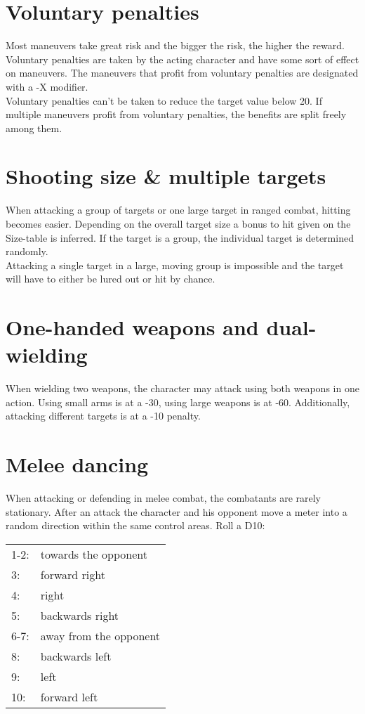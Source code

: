 \documentclass[12pt,a4paper,openany]{book}
\begin{document}
	\section{Voluntary penalties}
	Most maneuvers take great risk and the bigger the risk, the higher the reward. Voluntary penalties are taken by the acting character and have some sort of effect on maneuvers. The maneuvers that profit from voluntary penalties are designated with a -X modifier.\\
	Voluntary penalties can’t be taken to reduce the target value below 20. If multiple maneuvers profit from voluntary penalties, the benefits are split freely among them.
	\section{Shooting size \& multiple targets}
	When attacking a group of targets or one large target in ranged combat, hitting becomes easier. Depending on the overall target size a bonus to hit given on the Size-table is inferred. If the target is a group, the individual target is determined randomly.\\
	Attacking a single target in a large, moving group is impossible and the target will have to either be lured out or hit by chance.
	\section{One-handed weapons and dual-wielding}
	When wielding two weapons, the character may attack using both weapons in one action. Using small arms is at a -30, using large weapons is at -60. Additionally, attacking different targets is at a -10 penalty.
	\section{Melee dancing}
	When attacking or defending in melee combat, the combatants are rarely stationary. After an attack the character and his opponent move a meter into a random direction within the same control areas. Roll a D10:
	
	\begin{tabular}{ll}
		1-2: & towards the opponent\\
		3:   & forward right\\
		4:   & right\\
		5:   & backwards right\\
		6-7: & away from the opponent\\
		8:   & backwards left\\
		9:   & left\\
		10:  & forward left
	\end{tabular}
\end{document}
